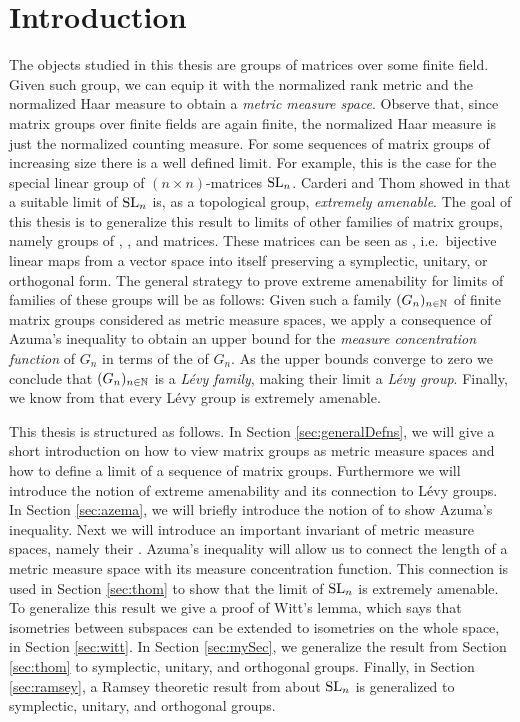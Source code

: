 
\section{Introduction}
The objects studied in this thesis are groups of matrices over some finite field.
Given such group, we can equip it with the normalized rank metric and the normalized Haar measure to obtain a \emph{metric measure space}. Observe that, since matrix groups over finite fields are again finite, the normalized Haar measure is just the normalized counting measure.
For some sequences of matrix groups of increasing size there is a well defined limit. For example, this is the case for the special linear group of $(n\times n)$-matrices $\operatorname{SL}_n$.
Carderi and Thom  showed in \cite{thom} that a suitable limit of $\operatorname{SL}_n$ is, as a topological group, \emph{extremely amenable}. The goal of this thesis is to generalize this result to limits of other families of matrix groups, namely groups of , , and  matrices.  
These matrices can be seen as , i.e.\ bijective linear maps from a vector space into itself preserving a symplectic, unitary, or orthogonal form.
The general strategy to prove extreme amenability for limits of families of these groups will be as follows: Given such a family $(G_n)_{n\in\mathbb{N}}$ of finite matrix groups considered as metric measure spaces, we apply a consequence of Azuma's inequality \cite{AzemaLevy} to obtain an upper bound for the \emph{measure concentration function} of $G_n$ in terms of the  of $G_n$.
As the upper bounds converge to zero we conclude that $(G_n)_{n\in\mathbb{N}}$ is a \emph{L\'{e}vy family}, making their limit a \emph{L\'{e}vy group}. Finally, we know from \cite{AzemaLevy} that every L\'{e}vy group is extremely amenable.

This thesis is structured as follows. In Section \ref{sec:generalDefns}, we will give a short introduction on how to view matrix groups as metric measure spaces and how to define a limit of a sequence of matrix groups. Furthermore we will introduce the notion of extreme amenability and its connection to L\'evy groups. In Section \ref{sec:azema}, we will briefly introduce the notion of  to show Azuma's inequality. Next we will introduce an important invariant of metric measure spaces, namely their . Azuma's inequality will allow us to connect the length of a metric measure space with its measure concentration function. This connection is used in Section \ref{sec:thom} to show that the limit of $\operatorname{SL}_n$ is extremely amenable. To generalize this result we give a proof of Witt's lemma, which says that isometries between subspaces can be extended to isometries on the whole space, in Section \ref{sec:witt}. In Section \ref{sec:mySec}, we generalize the result from Section \ref{sec:thom} to symplectic, unitary, and orthogonal groups. Finally, in Section \ref{sec:ramsey}, a Ramsey theoretic result from \cite{thom} about $\operatorname{SL}_n$ is generalized to symplectic, unitary, and orthogonal groups.

